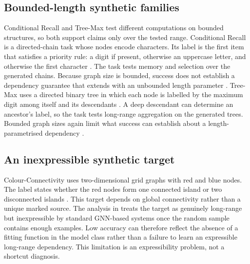 \subsection{Bounded-length synthetic families}

Conditional Recall and Tree-Max test different computations on bounded structures, so both support claims only over the tested range.
Conditional Recall is a directed-chain task whose nodes encode characters.
Its label is the first item that satisfies a priority rule: a digit if present, otherwise an uppercase letter, and otherwise the first character \cite{lukovnikov2021improving}.
The task tests memory and selection over the generated chains.
Because graph size is bounded, success does not establish a dependency guarantee that extends with an unbounded length parameter \cite{zhou2025glora}.
Tree-Max uses a directed binary tree in which each node is labelled by the maximum digit among itself and its descendants \cite{lukovnikov2021improving}.
A deep descendant can determine an ancestor's label, so the task tests long-range aggregation on the generated trees.
Bounded graph sizes again limit what success can establish about a length-parametrised dependency \cite{zhou2025glora}.

\subsection{An inexpressible synthetic target}

Colour-Connectivity uses two-dimensional grid graphs with red and blue nodes.
The label states whether the red nodes form one connected island or two disconnected islands \cite{rampasek2021hierarchical}.
This target depends on global connectivity rather than a unique marked source.
The analysis in \cite{zhou2025glora} treats the target as genuinely long-range but inexpressible by standard GNN-based systems once the random sample contains enough examples.
Low accuracy can therefore reflect the absence of a fitting function in the model class rather than a failure to learn an expressible long-range dependency.
This limitation is an expressibility problem, not a shortcut diagnosis.


